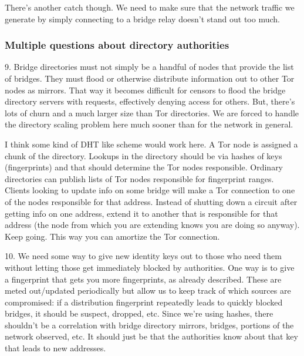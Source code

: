 \documentclass{llncs}
\begin{document}
There's another catch though. We need to make sure that the network
traffic we generate by simply connecting to a bridge relay doesn't stand
out too much.



\subsubsection{Multiple questions about directory authorities}


9. Bridge directories must not simply be a handful of nodes that
provide the list of bridges. They must flood or otherwise distribute
information out to other Tor nodes as mirrors. That way it becomes
difficult for censors to flood the bridge directory servers with
requests, effectively denying access for others. But, there's lots of
churn and a much larger size than Tor directories.  We are forced to
handle the directory scaling problem here much sooner than for the
network in general.

I think some kind of DHT like scheme would work here. A Tor node is
assigned a chunk of the directory.  Lookups in the directory should be
via hashes of keys (fingerprints) and that should determine the Tor
nodes responsible. Ordinary directories can publish lists of Tor nodes
responsible for fingerprint ranges.  Clients looking to update info on
some bridge will make a Tor connection to one of the nodes responsible
for that address.  Instead of shutting down a circuit after getting
info on one address, extend it to another that is responsible for that
address (the node from which you are extending knows you are doing so
anyway). Keep going.  This way you can amortize the Tor connection.

10. We need some way to give new identity keys out to those who need
them without letting those get immediately blocked by authorities. One
way is to give a fingerprint that gets you more fingerprints, as
already described. These are meted out/updated periodically but allow
us to keep track of which sources are compromised: if a distribution
fingerprint repeatedly leads to quickly blocked bridges, it should be
suspect, dropped, etc. Since we're using hashes, there shouldn't be a
correlation with bridge directory mirrors, bridges, portions of the
network observed, etc. It should just be that the authorities know
about that key that leads to new addresses.
\end{document}
